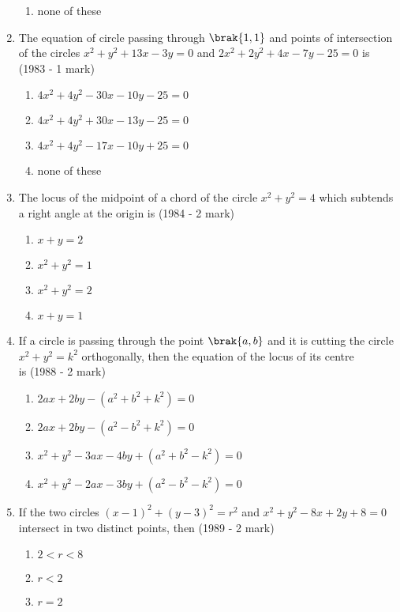 \begin{enumerate}
\begin{multicols}{2}
\begin{enumerate}
    		\item none of these
    	\end{enumerate}
    \end{multicols}
    \item The equation of circle passing through $\brak{1,1}$ and points of intersection of the circles $x^{2}+y^{2}+13x-3y=0$ and $2x^{2}+2y^{2}+4x-7y-25=0$ is
    \hfill {(1983 - 1 mark)}
    \begin{enumerate}
    	\item $4x^{2}+4y^{2}-30x-10y-25=0$
    	\item $4x^{2}+4y^{2}+30x-13y-25=0$
    	\item $4x^{2}+4y^{2}-17x-10y+25=0$
    	\item none of these
    \end{enumerate}
    \item The locus of the midpoint of a chord of the circle $x^{2}+y^{2}=4$ which subtends a right angle at the origin is \hfill {(1984 - 2 mark)}
    \begin{enumerate}
    	\item $x+y=2$
    	\item $x^{2}+y^{2}=1$
    	\item $x^{2}+y^{2}=2$
    	\item $x+y=1$
    \end{enumerate}
    \item If a circle is passing through the point $\brak{a,b}$ and it is cutting the circle $x^{2}+y^{2}=k^{2}$ orthogonally, then the equation of the locus of its centre \\ is 
    \hfill {(1988 - 2 mark)}
    \begin{enumerate}
    	\item $2ax + 2by - (a^{2}+b^{2}+k^{2}) = 0$
    	\item $2ax + 2by - (a^{2}-b^{2}+k^{2}) = 0$
    	\item $x^{2} + y^{2}-3ax-4by+ (a^{2}+b^{2}-k^{2}) = 0$
    	\item $x^{2} + y^{2}-2ax-3by+ (a^{2}-b^{2}-k^{2}) = 0$
    \end{enumerate}
    \item If the two circles $(x-1)^{2} + (y-3)^{2} = r^{2}$ and $x^{2}+y^{2}-8x+2y+8=0$ intersect in two distinct points, then \hfill {(1989 - 2 mark)} 
    \begin{enumerate}
    	\item $2<r<8$
    	\item $r<2$
    	\item $r=2$

\end{enumerate}
\end{enumerate}
